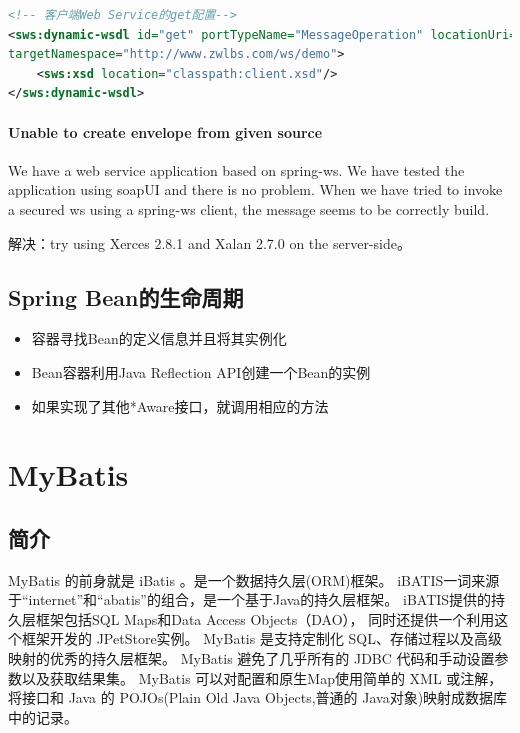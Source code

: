 \documentclass{book}
\begin{document}
\begin{lstlisting}[language=XML]
<!-- 客户端Web Service的get配置-->
<sws:dynamic-wsdl id="get" portTypeName="MessageOperation" locationUri="http://192.168.24.79:9090/clbs/webservice/get.wsdl"
targetNamespace="http://www.zwlbs.com/ws/demo">
	<sws:xsd location="classpath:client.xsd"/>
</sws:dynamic-wsdl>
\end{lstlisting}


\paragraph{Unable to create envelope from given source}

We have a web service application based on spring-ws. 
We have tested the application using soapUI and there is no problem. 
When we have tried to invoke a secured ws using a spring-ws client, the message seems to be correctly build.

解决：try using Xerces 2.8.1 and Xalan 2.7.0 on the server-side。

\subsection{Spring Bean的生命周期}

\begin{itemize}
	\item{容器寻找Bean的定义信息并且将其实例化}
	\item{Bean容器利用Java Reflection API创建一个Bean的实例}
	\item{如果实现了其他*Aware接口，就调用相应的方法}
\end{itemize}

\section{MyBatis}

\subsection{简介}

MyBatis 的前身就是 iBatis 。是一个数据持久层(ORM)框架。
iBATIS一词来源于“internet”和“abatis”的组合，是一个基于Java的持久层框架。
iBATIS提供的持久层框架包括SQL Maps和Data Access Objects（DAO），
同时还提供一个利用这个框架开发的 JPetStore实例。
MyBatis 是支持定制化 SQL、存储过程以及高级映射的优秀的持久层框架。
MyBatis 避免了几乎所有的 JDBC 代码和手动设置参数以及获取结果集。
MyBatis 可以对配置和原生Map使用简单的 XML 或注解，
将接口和 Java 的 POJOs(Plain Old Java Objects,普通的 Java对象)映射成数据库中的记录。
\end{document}
